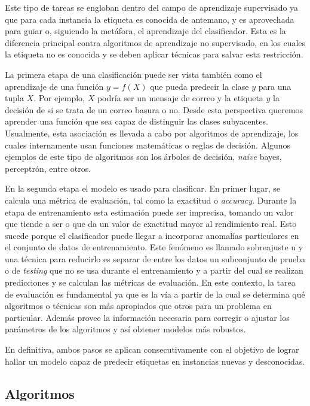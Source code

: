 Este tipo de tareas se engloban dentro del campo de aprendizaje supervisado ya
que para cada instancia la etiqueta es conocida de antemano, y es aprovechada
para guiar o, siguiendo la metáfora,  el aprendizaje del
clasificador. Esta es la diferencia principal contra algoritmos de aprendizaje
no supervisado, en los cuales la etiqueta no es conocida y se deben aplicar
técnicas para salvar esta restricción.

La primera etapa de una clasificación puede ser vista también como el
aprendizaje de una función $y=f(X)$ que pueda predecir la clase $y$ para una
tupla $X$. Por ejemplo, $X$ podría ser un mensaje de correo y la etiqueta $y$ la
decisión de si se trata de un correo basura o no. Desde esta perspectiva
queremos aprender una función que sea capaz de distinguir las clases
subyacentes.  Usualmente, esta asociación es llevada a cabo por algoritmos de
aprendizaje, los cuales internamente usan funciones matemáticas o reglas de
decisión. Algunos ejemplos de este tipo de algoritmos son los árboles de
decisión, \textit{naive} bayes, perceptrón, entre otros.

En la segunda etapa el modelo es usado para clasificar. En primer lugar, se
calcula una métrica de evaluación, tal como la exactitud o \textit{accuracy}.
Durante la etapa de entrenamiento esta estimación puede ser imprecisa, tomando
un valor que tiende a ser  o que da un valor de exactitud
mayor al rendimiento real. Esto sucede porque el clasificador puede llegar a
incorporar anomalías particulares en el conjunto de datos de entrenamiento. Este
fenómeno es llamado sobreajuste u  y una técnica para
reducirlo es separar de entre los datos un subconjunto de prueba o de
\textit{testing} que no se usa durante el entrenamiento y a partir del cual se
realizan predicciones y se calculan las métricas de evaluación. En este
contexto, la tarea de evaluación es fundamental ya que es la vía a partir de la
cual se determina qué algoritmos o técnicas son más apropiados que otros para un
problema en particular. Además provee la información necesaria para corregir o
ajustar los parámetros de los algoritmos y así obtener modelos más robustos.

En definitiva, ambos pasos se aplican consecutivamente con el objetivo de lograr
hallar un modelo capaz de predecir etiquetas en instancias nuevas y
desconocidas.

\subsection{Algoritmos}
\label{clasificacion_algoritmos}

